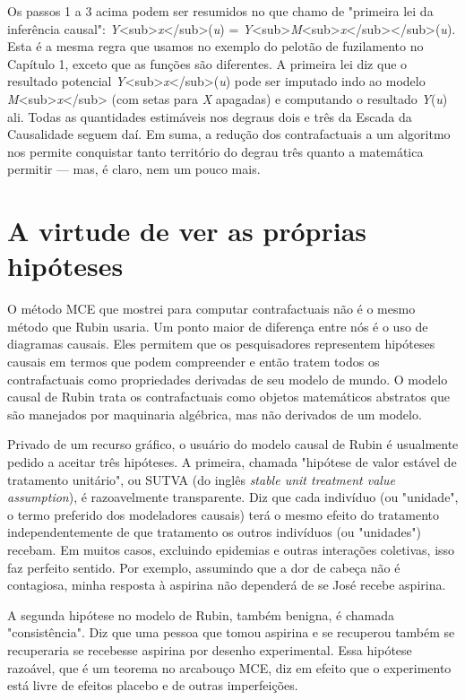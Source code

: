 \documentclass[11pt,a5paper,twoside]{book}
\begin{document}
Os passos 1 a 3 acima podem ser resumidos no que chamo de "primeira lei da inferência causal": \textit{Y}<sub>\textit{x}</sub>(\textit{u}) = \textit{Y}<sub>\textit{M}<sub>\textit{x}</sub></sub>(\textit{u}). Esta é a mesma regra que usamos no exemplo do pelotão de fuzilamento no Capítulo 1, exceto que as funções são diferentes. A primeira lei diz que o resultado potencial \textit{Y}<sub>\textit{x}</sub>(\textit{u}) pode ser imputado indo ao modelo \textit{M}<sub>\textit{x}</sub> (com setas para \textit{X} apagadas) e computando o resultado \textit{Y}(\textit{u}) ali. Todas as quantidades estimáveis nos degraus dois e três da Escada da Causalidade seguem daí. Em suma, a redução dos contrafactuais a um algoritmo nos permite conquistar tanto território do degrau três quanto a matemática permitir — mas, é claro, nem um pouco mais.

\section{A virtude de ver as próprias hipóteses}
O método MCE que mostrei para computar contrafactuais não é o mesmo método que Rubin usaria. Um ponto maior de diferença entre nós é o uso de diagramas causais. Eles permitem que os pesquisadores representem hipóteses causais em termos que podem compreender e então tratem todos os contrafactuais como propriedades derivadas de seu modelo de mundo. O modelo causal de Rubin trata os contrafactuais como objetos matemáticos abstratos que são manejados por maquinaria algébrica, mas não derivados de um modelo.

Privado de um recurso gráfico, o usuário do modelo causal de Rubin é usualmente pedido a aceitar três hipóteses. A primeira, chamada "hipótese de valor estável de tratamento unitário", ou SUTVA (do inglês \textit{stable unit treatment value assumption}), é razoavelmente transparente. Diz que cada indivíduo (ou "unidade", o termo preferido dos modeladores causais) terá o mesmo efeito do tratamento independentemente de que tratamento os outros indivíduos (ou "unidades") recebam. Em muitos casos, excluindo epidemias e outras interações coletivas, isso faz perfeito sentido. Por exemplo, assumindo que a dor de cabeça não é contagiosa, minha resposta à aspirina não dependerá de se José recebe aspirina.

A segunda hipótese no modelo de Rubin, também benigna, é chamada "consistência". Diz que uma pessoa que tomou aspirina e se recuperou também se recuperaria se recebesse aspirina por desenho experimental. Essa hipótese razoável, que é um teorema no arcabouço MCE, diz em efeito que o experimento está livre de efeitos placebo e de outras imperfeições.
\end{document}
